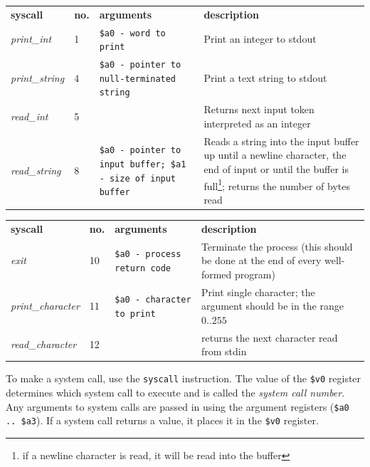 \documentclass[12pt]{article}
\begin{document}
\begin{tabular}{p{} || p{} | p{} | p{}}
    \textbf{syscall} & \textbf{no.} & \textbf{arguments} &
     \textbf{description} \\ \hhline{=#=|=|=}

    \textit{print\_int} & 1 & \texttt{\$a0 - word to print} & Print an integer
     to stdout \\ \hline

    \textit{print\_string} & 4 & \texttt{\$a0 - pointer to null-terminated string} 
        & Print a text string to stdout \\ \hline

    \textit{read\_int} & 5 &  & Returns next input token interpreted as an
     integer \\ \hline

    \textit{read\_string} & 8 & \texttt{\$a0 - pointer to input buffer; \$a1 -
     size of input buffer} & Reads a string into the input
     buffer up until a newline character, the end of input or until the buffer
     is full\footnote{if a newline character is read, it will be read into the
     buffer}; returns the number of bytes read \\ \hline
\end{tabular}

\begin{tabular}{p{} || p{} | p{} | p{}}
    \textbf{syscall} & \textbf{no.} & \textbf{arguments} &
     \textbf{description} \\ \hhline{=#=|=|=}

    \textit{exit} & 10 & \texttt{\$a0 - process return code} & Terminate the
     process (this should be done at the end of every well-formed program)
     \\ \hline

    \textit{print\_character} & 11 & \texttt{\$a0 - character to print} & Print
     single character; the argument should be in the range $0..255$ \\ \hline

    \textit{read\_character} & 12 & & returns the next character read from stdin\\
\end{tabular}

\vspace{0.25in}
To make a system call, use the \texttt{syscall} instruction. The value of the
     \texttt{\$v0} register determines which system call to execute and is
     called the \textit{system call number}. Any arguments to system calls are
     passed in using the argument registers (\texttt{\$a0 .. \$a3}). If a system
     call returns a value, it places it in the \texttt{\$v0} register.\\
\end{document}
